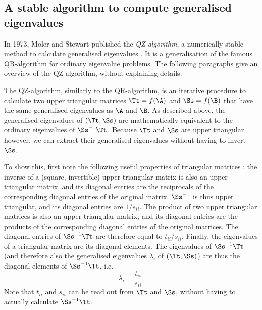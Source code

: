 



\subsection{A stable algorithm to compute generalised eigenvalues}

In 1973, Moler and Stewart published the \emph{QZ-algorithm}, a numerically
stable method to calculate generalised eigenvalues \cite{Moler1973}. It is a
generalisation of the famous QR-algorithm \cite{Trefethen1997} for ordinary
eigenvalue problems. The following paragraphs give an overview of the
QZ-algorithm, without explaining details.

The QZ-algorithm, similarly to the QR-algorithm, is an iterative procedure to
calculate two upper triangular matrices $\Tt = f(\A)$ and $\Ss = f(\B)$ that
have the same generalised eigenvalues as $\A$ and $\B$. As described above,
the generalised eigenvalues of $(\Tt,\Ss)$ are mathematically equivalent to
the ordinary eigenvalues of $\Ss^{-1} \Tt$. Because $\Tt$ and $\Ss$ are upper
triangular however,\footnotemark{} we can extract their generalised
eigenvalues without having to invert $\Ss$.


To show this, first note the following useful properties of triangular
matrices \cite{Horn2013}: the inverse of a (square, invertible) upper
triangular matrix is also an upper triangular matrix, and its diagonal
entries are the reciprocals of the corresponding diagonal entries of the
original matrix. $\Ss^{-1}$ is thus upper triangular, and its diagonal
entries are $1 / s_{ii}$. The product of two upper triangular matrices is
also an upper triangular matrix, and its diagonal entries are the products of
the corresponding diagonal entries of the original matrices. The diagonal
entries of $\Ss^{-1} \Tt$ are therefore equal to $t_{ii} / s_{ii}$. Finally,
the eigenvalues of a triangular matrix are its diagonal elements. The
eigenvalues of $\Ss^{-1}\Tt$ (and therefore also the generalised eigenvalues
$\lambda_i$ of $(\Tt,\Ss)$) are thus the diagonal elements of $\Ss^{-1} \Tt$,
i.e.
%
\begin{equation}
\label{eq:lambda}
\lambda_i = \frac{t_{ii}}{s_{ii}}.
\end{equation}
%
Note that $t_{ii}$ and $s_{ii}$ can be read out from $\Tt$ and $\Ss$, without
having to actually calculate $\Ss^{-1} \Tt$.

